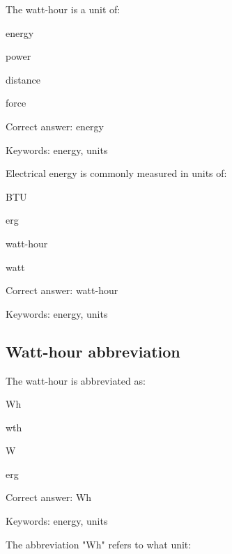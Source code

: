\begin{question}
	\item The watt-hour is a unit of:
\end{question}

\begin{answer}
	\item energy
	\item power
	\item distance
	\item force
\end{answer}

Correct answer: energy

Keywords: energy, units

\begin{question}
	\item Electrical energy is commonly measured in units of:
\end{question}

\begin{answer}
	\item BTU
	\item erg
	\item watt-hour
	\item watt
\end{answer}

Correct answer: watt-hour

Keywords: energy, units

\subsection{Watt-hour abbreviation}

\begin{question}
	\item The watt-hour is abbreviated as:
\end{question}

\begin{answer}
	\item Wh
	\item wth
	\item W
	\item erg
\end{answer}

Correct answer: Wh

Keywords: energy, units

\begin{question}
	\item The abbreviation "Wh" refers to what unit:
\end{question}

